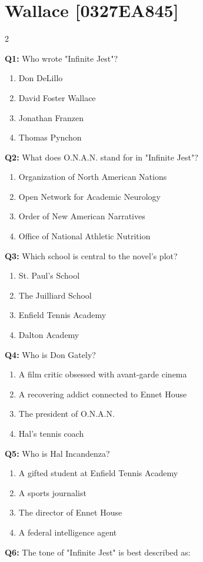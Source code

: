 \documentclass[10pt]{article}
\begin{document}
\section*{Wallace \footnotesize [0327EA845]}
\begin{multicols}{2}

\textbf{Q1:} Who wrote "Infinite Jest"?

\begin{enumerate}[label=\arabic*.]
\item Don DeLillo
\item David Foster Wallace
\item Jonathan Franzen
\item Thomas Pynchon
\end{enumerate}
\textbf{Q2:} What does O.N.A.N. stand for in "Infinite Jest"?

\begin{enumerate}[label=\arabic*.]
\item Organization of North American Nations
\item Open Network for Academic Neurology
\item Order of New American Narratives
\item Office of National Athletic Nutrition
\end{enumerate}
\textbf{Q3:} Which school is central to the novel's plot?

\begin{enumerate}[label=\arabic*.]
\item St. Paul's School
\item The Juilliard School
\item Enfield Tennis Academy
\item Dalton Academy
\end{enumerate}
\textbf{Q4:} Who is Don Gately?

\begin{enumerate}[label=\arabic*.]
\item A film critic obsessed with avant-garde cinema
\item A recovering addict connected to Ennet House
\item The president of O.N.A.N.
\item Hal's tennis coach
\end{enumerate}
\textbf{Q5:} Who is Hal Incandenza?

\begin{enumerate}[label=\arabic*.]
\item A gifted student at Enfield Tennis Academy
\item A sports journalist
\item The director of Ennet House
\item A federal intelligence agent
\end{enumerate}
\textbf{Q6:} The tone of "Infinite Jest" is best described as:


\end{multicols}
\end{document}
